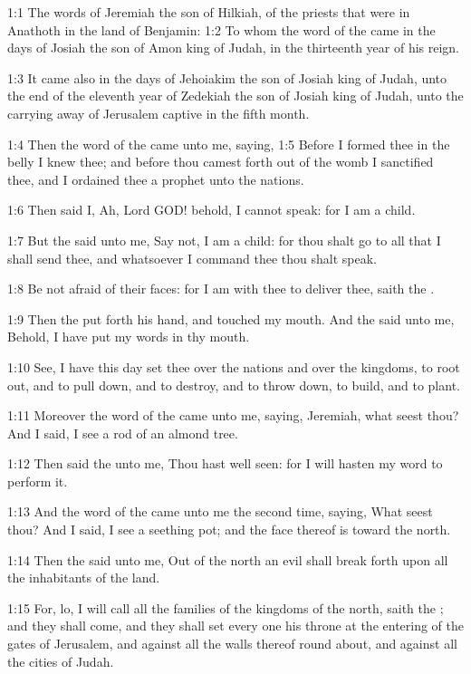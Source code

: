 

1:1 The words of Jeremiah the son of Hilkiah, of the priests that
were in Anathoth in the land of Benjamin: 1:2 To whom the word of the
\LORD came in the days of Josiah the son of Amon king of Judah, in the
thirteenth year of his reign.

1:3 It came also in the days of Jehoiakim the son of Josiah king of
Judah, unto the end of the eleventh year of Zedekiah the son of Josiah
king of Judah, unto the carrying away of Jerusalem captive in the
fifth month.

1:4 Then the word of the \LORD came unto me, saying, 1:5 Before I
formed thee in the belly I knew thee; and before thou camest forth out
of the womb I sanctified thee, and I ordained thee a prophet unto the
nations.

1:6 Then said I, Ah, Lord GOD! behold, I cannot speak: for I am a
child.

1:7 But the \LORD said unto me, Say not, I am a child: for thou shalt
go to all that I shall send thee, and whatsoever I command thee thou
shalt speak.

1:8 Be not afraid of their faces: for I am with thee to deliver thee,
saith the \LORD.

1:9 Then the \LORD put forth his hand, and touched my mouth. And the
\LORD said unto me, Behold, I have put my words in thy mouth.

1:10 See, I have this day set thee over the nations and over the
kingdoms, to root out, and to pull down, and to destroy, and to throw
down, to build, and to plant.

1:11 Moreover the word of the \LORD came unto me, saying, Jeremiah,
what seest thou? And I said, I see a rod of an almond tree.

1:12 Then said the \LORD unto me, Thou hast well seen: for I will
hasten my word to perform it.

1:13 And the word of the \LORD came unto me the second time, saying,
What seest thou? And I said, I see a seething pot; and the face
thereof is toward the north.

1:14 Then the \LORD said unto me, Out of the north an evil shall break
forth upon all the inhabitants of the land.

1:15 For, lo, I will call all the families of the kingdoms of the
north, saith the \LORD; and they shall come, and they shall set every
one his throne at the entering of the gates of Jerusalem, and against
all the walls thereof round about, and against all the cities of
Judah.

